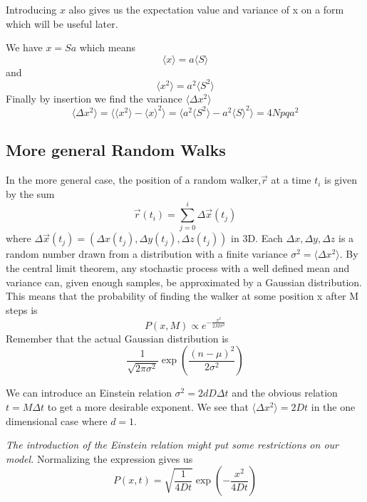 Introducing $x$ also gives us the expectation value and variance of x on a form which will be useful later. 

We have $x=Sa$ which means 
$$\langle x\rangle=a\langle S\rangle$$ 
and 
$$\langle x^2\rangle=a^2\langle S^2\rangle$$
Finally by insertion we find the variance $\langle \Delta x^2\rangle$
\begin{equation}\label{random_walk_variance}
 \langle \Delta x^2\rangle = \langle\langle x^2\rangle -\langle x\rangle^2\rangle = \langle a^2\langle S^2\rangle -a^2\langle S\rangle^2\rangle = 4Npqa^2
\end{equation}


\subsection{More general Random Walks}\label{more_general_random_walks}

In the more general case, the position of a random walker,$\vec{r}$ at a time $t_i$ is given by the sum
\begin{equation}\label{brownian_motion}
 \vec{r}(t_i)=\sum\limits_{j=0}^i \Delta \vec{x}(t_j)
\end{equation}
where $\Delta \vec{x}(t_j) = \left(\Delta x(t_j),\Delta y(t_j),\Delta z(t_j)\right)$ in 3D. Each $\Delta x,\Delta y,\Delta z$ is a random number drawn from a distribution with a finite variance $\sigma^2 = \langle\Delta x^2\rangle$. 
By the central limit theorem, any stochastic process with a well defined mean and variance can, given enough samples, be approximated by a Gaussian distribution. 
This means that the probability of finding the walker at some position x after M steps is 
\begin{equation}
 P(x,M)\propto e^{-\frac{x^2}{2M\sigma^2}}
\end{equation}
Remember that the actual Gaussian distribution is 
$$
\frac{1}{\sqrt{2\pi\sigma^2}}\exp\left(\frac{(n-\mu)^2}{2\sigma^2}\right)
$$

We can introduce an Einstein relation $\sigma^2 = 2dD\Delta t$ and the obvious relation $t = M\Delta t$ to get a more desirable exponent.
We see that $\langle \Delta x^2\rangle = 2Dt$ in the one dimensional case where $d=1$. 

\emph{The introduction of the Einstein relation might put some restrictions on our model.}
Normalizing the expression gives us 
\begin{equation}\label{rw_gaussian_distribution}
 P(x,t) = \sqrt{\frac{1}{4Dt}}\exp\left(-\frac{x^2}{4Dt}\right)
\end{equation}


